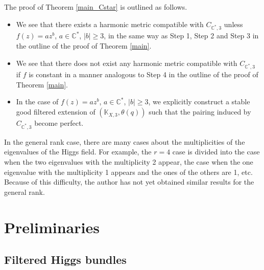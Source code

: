 \documentclass[pdftex]{sigma}
\numberwithin{equation}{section}
\newcommand{\C}{\mathbb{C}}
\begin{document}
The proof of Theorem \ref{main_Cstar} is outlined as follows.
\begin{itemize}\itemsep=0pt\setlength{\leftskip}{0.55cm}
 \item[{\bf Step 1$'$}] We see that there exists a harmonic metric compatible with $C_{\C^*,3}$ unless $f(z)= az^b$, $a\in \C^*$, $|b|\geq 3$, in the same way as Step 1, Step 2 and Step 3 in the outline of the proof of Theorem \ref{main}.
 \item[{\bf Step 2$'$}] We see that there does not exist any harmonic metric compatible with $C_{\C^*,3}$ if $f$ is constant in a manner analogous to Step 4 in the outline of the proof of Theorem \ref{main}.
 \item[{\bf Step 3$'$}] In the case of $f(z)=az^b$, $a\in \C^*$, $|b|\geq 3$, we explicitly construct a stable good filtered extension of $(\mathbb{K}_{X,3},\theta(q))$ such that the pairing induced by $C_{\C^*,3}$ become perfect.
\end{itemize}

In the general rank case, there are many cases about the multiplicities of the eigenvalues of the Higgs field. For example, the $r=4$ case is divided into the case when the two eigenvalues with the multiplicity 2 appear, the case when the one eigenvalue with the multiplicity 1 appears and the ones of the others are 1, etc. Because of this difficulty, the author has not yet obtained similar results for the general rank.

\section{Preliminaries}\label{sec2}
\subsection{Filtered Higgs bundles}
\end{document}

